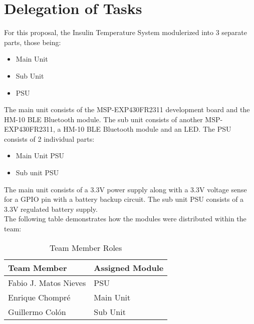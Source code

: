 \section{Delegation of Tasks}
For this proposal, the Insulin Temperature System modulerized into 3 separate parts, those being:
\begin{itemize}
  \item Main Unit
  \item Sub Unit
  \item PSU
\end{itemize}
The main unit consists of the MSP-EXP430FR2311 development board and the HM-10 BLE Bluetooth module. The sub unit consists of another MSP-EXP430FR2311, a HM-10 BLE Bluetooth module and an LED. The PSU consists of 2 individual parts:
\begin{itemize}
  \item Main Unit PSU
  \item Sub unit PSU
\end{itemize}
The main unit consists of a 3.3\si{\V} power supply along with a 3.3\si{\V} voltage sense for a GPIO pin with a battery backup circuit.  The sub unit PSU consists of a 3.3\si{\V} regulated battery supply.\\
The following table demonstrates how the modules were distributed within the team:
\begin{table}[h]
\begin{center}
\begin{tabularx}{\textwidth}{|X|X|}
 \hline
 Team Member & Assigned Module\\
 \hline
 Fabio J. Matos Nieves & PSU\\
 \hline
 Enrique Chompré & Main Unit\\
 \hline
 Guillermo Colón & Sub Unit\\
 \hline
\end{tabularx}
\end{center}
\caption{Team Member Roles}
\label{Task-Delegation}
\end{table}
